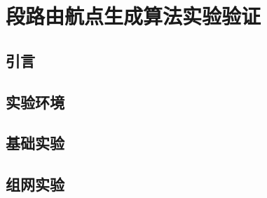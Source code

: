 \chapter{段路由航点生成算法实验验证}

\section{引言}



\section{实验环境}

\section{基础实验}

\section{组网实验}



\ifx\usechapbib\empty
\nocite{BSTcontrol}
\setcounter{NAT@ctr}{0}


\fi
